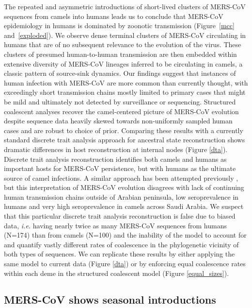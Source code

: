 \documentclass[9pt,lineno]{elife}
\begin{document}
The repeated and asymmetric introductions of short-lived clusters of MERS-CoV sequences from camels into humans leads us to conclude that MERS-CoV epidemiology in humans is dominated by zoonotic transmission (Figure~\ref{mcc} and~\ref{exploded}).
We observe dense terminal clusters of MERS-CoV circulating in humans that are of no subsequent relevance to the evolution of the virus.
These clusters of presumed human-to-human transmission are then embedded within extensive diversity of MERS-CoV lineages inferred to be circulating in camels, a classic pattern of source-sink dynamics.
Our findings suggest that instances of human infection with MERS-CoV are more common than currently thought, with exceedingly short transmission chains mostly limited to primary cases that might be mild and ultimately not detected by surveillance or sequencing.
Structured coalescent analyses recover the camel-centered picture of MERS-CoV evolution despite sequence data heavily skewed towards non-uniformly sampled human cases and are robust to choice of prior.
Comparing these results with a currently standard discrete trait analysis \citep{lemey_bayesian_2009} approach for ancestral state reconstruction shows dramatic differences in host reconstruction at internal nodes (Figure \ref{dta}).
Discrete trait analysis reconstruction identifies both camels and humans as important hosts for MERS-CoV persistence, but with humans as the ultimate source of camel infections.
A similar approach has been attempted previously \citep{zhang_evolutionary_2016}, but this interpretation of MERS-CoV evolution disagrees with lack of continuing human transmission chains outside of Arabian peninsula, low seroprevalence in humans and very high seroprevalence in camels across Saudi Arabia.
We suspect that this particular discrete trait analysis reconstruction is false due to biased data, \textit{i.e.} having nearly twice as many MERS-CoV sequences from humans (N=174) than from camels (N=100) and the inability of the model to account for and quantify vastly different rates of coalescence in the phylogenetic vicinity of both types of sequences.
We can replicate these results by either applying the same model to current data (Figure \ref{dta}) or by enforcing equal coalescence rates within each deme in the structured coalescent model (Figure \ref{equal_sizes}).


\subsection*{MERS-CoV shows seasonal introductions}
\end{document}
